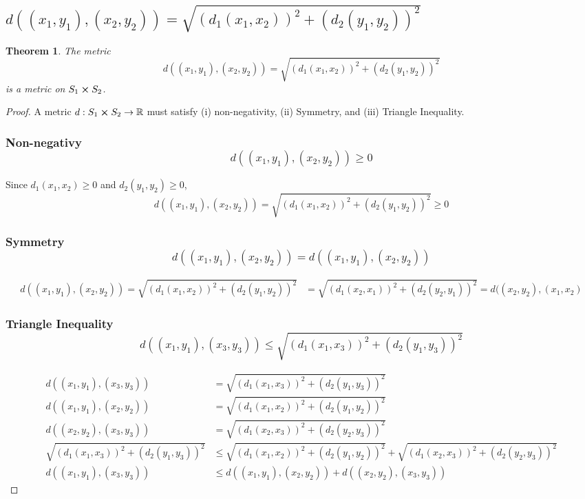 \documentclass[]{article}
\newcommand{\R}{\mathbb{R}}
\newtheorem{theorem}{Theorem}
\begin{document}
\newpage
\subsection{$d((x_1,y_1),(x_2,y_2)) = \sqrt{(d_1(x_1,x_2))^2+(d_2(y_1,y_2))^2}$}

\begin{theorem}
    The metric $$d((x_1,y_1),(x_2,y_2)) = \sqrt{(d_1(x_1,x_2))^2+(d_2(y_1,y_2))^2}$$
    is a metric on $S_1 \cross S_2$.
\end{theorem}
\begin{proof}
    A metric $d: S_1 \cross S_2 \to \R$ must satisfy (i) non-negativity, 
    (ii) Symmetry, and (iii) Triangle Inequality.
    \subsubsection{Non-negativy $$d((x_1,y_1), (x_2,y_2)) \geq 0$$}
        Since $d_1(x_1,x_2) \geq 0$ and $d_2(y_1,y_2) \geq 0$,
        $$d((x_1,y_1), (x_2,y_2)) = \sqrt{(d_1(x_1,x_2))^2+(d_2(y_1,y_2))^2} \geq 0$$
    \subsubsection{Symmetry $$d((x_1,y_1),(x_2,y_2))=d((x_1,y_1),(x_2,y_2))$$}
    \begin{align*}
        d((x_1,y_1), (x_2,y_2)) = \sqrt{(d_1(x_1,x_2))^2+(d_2(y_1,y_2))^2}
        &= \sqrt{(d_1(x_2,x_1))^2+(d_2(y_2,y_1))^2} = d((x_2,y_2),(x_1,x_2)
    \end{align*}
    \subsubsection{Triangle Inequality 
    $$d((x_1,y_1),(x_3,y_3)) \leq \sqrt{(d_1(x_1,x_3))^2+(d_2(y_1,y_3))^2}$$
    }
    \begin{align*}
        d((x_1,y_1),(x_3,y_3)) &= \sqrt{(d_1(x_1,x_3))^2+(d_2(y_1,y_3))^2}\\
        d((x_1,y_1),(x_2,y_2)) &= \sqrt{(d_1(x_1,x_2))^2+(d_2(y_1,y_2))^2}\\
        d((x_2,y_2),(x_3,y_3)) &= \sqrt{(d_1(x_2,x_3))^2+(d_2(y_2,y_3))^2}\\
        \sqrt{(d_1(x_1,x_3))^2+(d_2(y_1,y_3))^2}
            &\leq \sqrt{(d_1(x_1,x_2))^2+(d_2(y_1,y_2))^2}
            + \sqrt{(d_1(x_2,x_3))^2+(d_2(y_2,y_3))^2}\\
        d((x_1,y_1),(x_3,y_3)) &\leq d((x_1,y_1),(x_2,y_2)) + d((x_2,y_2),(x_3,y_3))
    \end{align*}
\end{proof}
\end{document}
